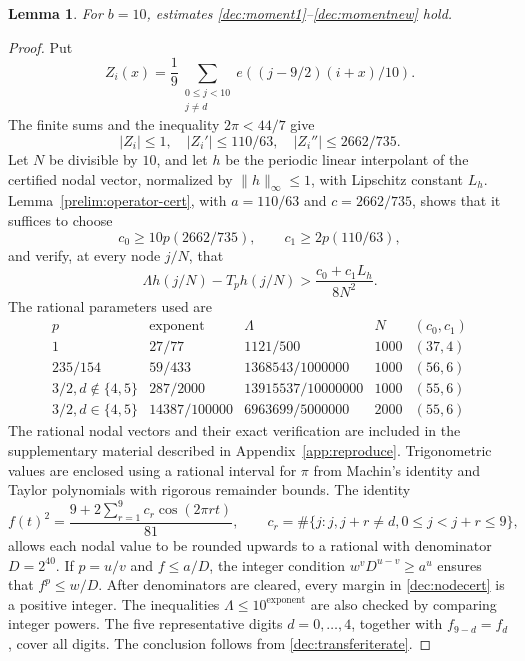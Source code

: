 \documentclass[11pt,a4paper]{article}
\theoremstyle{paperplain}
\newtheorem{lemma}[theorem]{Lemma}
\numberwithin{equation}{section}
\begin{document}
\begin{lemma}\label{dec:decimalcert}
For $b=10$, estimates \eqref{dec:moment1}--\eqref{dec:momentnew} hold.
\end{lemma}
\begin{proof}
Put
\[
 Z_i(x)=\frac19\sum_{\substack{0\le j<10\\j\ne d}}
                         e((j-9/2)(i+x)/10).
\]
The finite sums and the inequality $2\pi<44/7$ give
\[
 |Z_i|\le1,\quad |Z_i'|\le110/63,\quad |Z_i''|\le2662/735.
\]
Let $N$ be divisible by $10$, and let $h$ be the periodic linear
interpolant of the certified nodal vector, normalized by
$\|h\|_\infty\le1$, with Lipschitz constant $L_h$.
Lemma~\ref{prelim:operator-cert}, with
$a=110/63$ and $c=2662/735$, shows that it suffices to choose
\[
 c_0\ge10p(2662/735),\qquad c_1\ge2p(110/63),
\]
and verify, at every node $j/N$, that
\begin{equation}\label{dec:nodecert}
 \Lambda h(j/N)-T_ph(j/N)>\frac{c_0+c_1L_h}{8N^2}.
\end{equation}
The rational parameters used are
\[
\begin{array}{c|c|c|c|c}
 p&\text{exponent}&\Lambda&N&(c_0,c_1)\\ \hline
 1&27/77&1121/500&1000&(37,4)\\
 235/154&59/433&1368543/1000000&1000&(56,6)\\
 3/2, d\notin\{4,5\}&287/2000&13915537/10000000&1000&(55,6)\\
 3/2, d\in\{4,5\}&14387/100000&6963699/5000000&2000&(55,6)
\end{array}
\]
The rational nodal vectors and their exact verification are included in
the supplementary material described in Appendix~\ref{app:reproduce}.
Trigonometric values are enclosed using a rational interval for $\pi$ from
Machin's identity and Taylor polynomials with rigorous remainder bounds.
The identity
\[
 f(t)^2=\frac{9+2\sum_{r=1}^9c_r\cos(2\pi rt)}{81},\qquad
 c_r=\#\{j:j,j+r\ne d, 0\le j<j+r\le9\},
\]
allows each nodal value to be rounded upwards to a rational with denominator
$D=2^{40}$. If $p=u/v$ and $f\le a/D$, the integer condition
$w^vD^{u-v}\ge a^u$ ensures that $f^p\le w/D$.
After denominators are cleared, every margin in \eqref{dec:nodecert} is
a positive integer. The inequalities $\Lambda\le10^{\text{exponent}}$
are also checked by comparing integer powers. The five representative digits
$d=0,\ldots,4$, together with $f_{9-d}=f_d$, cover all digits.
The conclusion follows from \eqref{dec:transferiterate}.
\end{proof}
\end{document}
